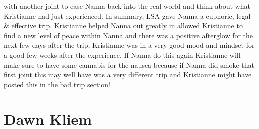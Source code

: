 \documentclass[12pt]{book}
\begin{document}
with another joint to ease Nanna back into the real world and think about what Kristianne had just experienced. In summary, LSA gave Nanna a euphoric, legal \& effective trip. Kristianne helped Nanna out greatly in allowed Kristianne to find a new level of peace within Nanna and there was a positive afterglow for the next few days after the trip, Kristianne was in a very good mood and mindset for a good few weeks after the experience. If Nanna do this again Kristianne will make sure to have some cannabis for the nausea because if Nanna did smoke that first joint this may well have was a very different trip and Kristianne might have posted this in the bad trip section!



\chapter{Dawn Kliem}
\end{document}
